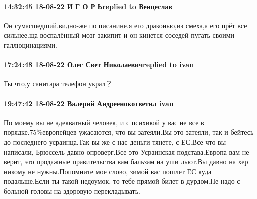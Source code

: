  
 
 
 
 

\paragraph{14:32:45 18-08-22 И Г О Р Ьreplied to Венцеслав}

Он сумасшедший.видно-же по писанине.я его драконью,из смеха,а его прёт все
сильнее.ща воспалённый мозг закипит и он кинется соседей пугать своими
галлюцинациями.

\paragraph{17:24:48 18-08-22 Олег Свет Николаевичreplied to ivan}

Ты что,у санитара телефон украл？

\paragraph{19:47:42 18-08-22 Валерий Андреенокответил ivan}

По моему вы не адекватный человек, и с психикой у вас не все в
порядке.75\%европейцев ужасаются, что вы затеяли.Вы это затеяли, так и бейтесь
до последнего усраинца.Так вы же с нас деньги тянете, с ЕС.Все что вы написали,
Брюссель давно опроверг.Все это Усраинская подстава.Европа вам не верит, это
продажные правительства вам бальзам на уши льют.Вы давно на хер никому не
нужны.Попомните мое слово, зимой вас пошлет ЕС куда подальше.Если ты такой
недоумок, то тебе прямой билет в дурдом.Не надо с больной головы на здоровую
перекладывать.
